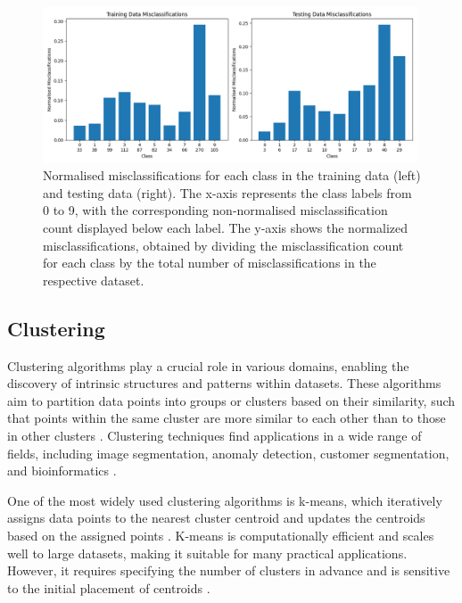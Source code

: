 \begin{figure}[h]
    \centering
    \includegraphics[width=0.99\textwidth]{Figures/Methods/mnist_combined_misclassifications.png}
    \caption{Normalised misclassifications for each class in the training data (left) and testing data (right). The x-axis represents the class labels from 0 to 9, with the corresponding non-normalised misclassification count displayed below each label. The y-axis shows the normalized misclassifications, obtained by dividing the misclassification count for each class by the total number of misclassifications in the respective dataset. }
    \label{fig:mnist_combined_misclassifications}
\end{figure}

\subsection{Clustering}

Clustering algorithms play a crucial role in various domains, enabling the discovery of intrinsic structures and patterns within datasets. These algorithms aim to partition data points into groups or clusters based on their similarity, such that points within the same cluster are more similar to each other than to those in other clusters \citep{jain2010data}. Clustering techniques find applications in a wide range of fields, including image segmentation, anomaly detection, customer segmentation, and bioinformatics \citep{xu2015comprehensive}.

One of the most widely used clustering algorithms is k-means, which iteratively assigns data points to the nearest cluster centroid and updates the centroids based on the assigned points \citep{lloyd1982least}. K-means is computationally efficient and scales well to large datasets, making it suitable for many practical applications. However, it requires specifying the number of clusters in advance and is sensitive to the initial placement of centroids \citep{arthur2007k}.

